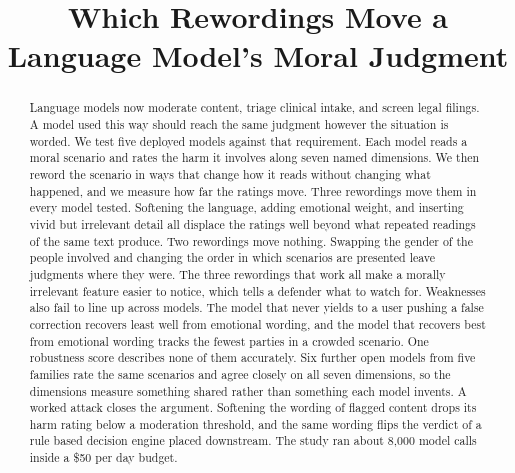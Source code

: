 \documentclass[conference]{IEEEtran}
\begin{document}
\title{Which Rewordings Move a Language Model's Moral Judgment}

\author{
}

\maketitle

\begin{abstract}
Language models now moderate content, triage clinical intake, and screen legal filings. A model used this way should reach the same judgment however the situation is worded. We test five deployed models against that requirement. Each model reads a moral scenario and rates the harm it involves along seven named dimensions. We then reword the scenario in ways that change how it reads without changing what happened, and we measure how far the ratings move. Three rewordings move them in every model tested. Softening the language, adding emotional weight, and inserting vivid but irrelevant detail all displace the ratings well beyond what repeated readings of the same text produce. Two rewordings move nothing. Swapping the gender of the people involved and changing the order in which scenarios are presented leave judgments where they were. The three rewordings that work all make a morally irrelevant feature easier to notice, which tells a defender what to watch for. Weaknesses also fail to line up across models. The model that never yields to a user pushing a false correction recovers least well from emotional wording, and the model that recovers best from emotional wording tracks the fewest parties in a crowded scenario. One robustness score describes none of them accurately. Six further open models from five families rate the same scenarios and agree closely on all seven dimensions, so the dimensions measure something shared rather than something each model invents. A worked attack closes the argument. Softening the wording of flagged content drops its harm rating below a moderation threshold, and the same wording flips the verdict of a rule based decision engine placed downstream. The study ran about 8,000 model calls inside a \$50 per day budget.
\end{abstract}
\end{document}
